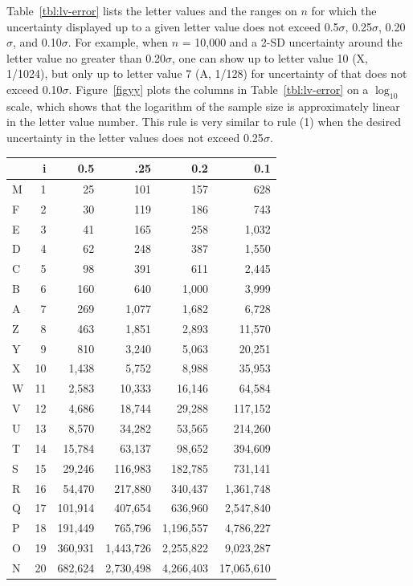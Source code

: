 \documentclass[oneside]{article}
\begin{document}
Table~\ref{tbl:lv-error} lists the letter values and the ranges on $n$ for which the uncertainty displayed up to a given letter value does not exceed 0.5$\sigma$, 0.25$\sigma$, 0.20$\sigma$, and 0.10$\sigma$. For example, when $n$ = 10,000 and a 2-SD uncertainty around the letter value no greater than 0.20$\sigma$, one can show up to letter value 10 (X, 1/1024), but only up to letter value 7 (A, 1/128) for uncertainty of that does not exceed 0.10$\sigma$. Figure~\ref{figyy} plots the columns in Table~\ref{tbl:lv-error} on a $\log_{10}$ scale, which shows that the logarithm of the sample size is approximately linear in the letter value number. This rule is very similar to rule (1) when the desired uncertainty in the letter values does not exceed 0.25$\sigma$.

\begin{table}
  \begin{center}
  \begin{tabular}{lrrrrr}
    \toprule
      &  i &    0.5 &     .25 &     0.2 &      0.1 \\
    \midrule
    M &  1 &     25 &     101 &     157 &      628 \\
    F &  2 &     30 &     119 &     186 &      743 \\
    E &  3 &     41 &     165 &     258 &     1,032 \\
    D &  4 &     62 &     248 &     387 &     1,550 \\
    C &  5 &     98 &     391 &     611 &     2,445 \\[3pt]
    B &  6 &    160 &     640 &    1,000 &     3,999 \\
    A &  7 &    269 &    1,077 &    1,682 &     6,728 \\
    Z &  8 &    463 &    1,851 &    2,893 &    11,570 \\
    Y &  9 &    810 &    3,240 &    5,063 &    20,251 \\
    X & 10 &   1,438 &    5,752 &    8,988 &    35,953  \\[3pt]
    W & 11 &   2,583 &   10,333 &   16,146 &    64,584 \\
    V & 12 &   4,686 &   18,744 &   29,288 &   117,152 \\
    U & 13 &   8,570 &   34,282 &   53,565 &   214,260 \\
    T & 14 &  15,784 &   63,137 &   98,652 &   394,609 \\
    S & 15 &  29,246 &  116,983 &  182,785 &   731,141  \\[3pt]
    R & 16 &  54,470 &  217,880 &  340,437 &  1,361,748 \\
    Q & 17 & 101,914 &  407,654 &  636,960 &  2,547,840 \\
    P & 18 & 191,449 &  765,796 & 1,196,557 &  4,786,227 \\
    O & 19 & 360,931 & 1,443,726 & 2,255,822 &  9,023,287 \\
    N & 20 & 682,624 & 2,730,498 & 4,266,403 & 17,065,610 \\
    \bottomrule
    

\end{tabular}
\end{center}
\end{table}
\end{document}
